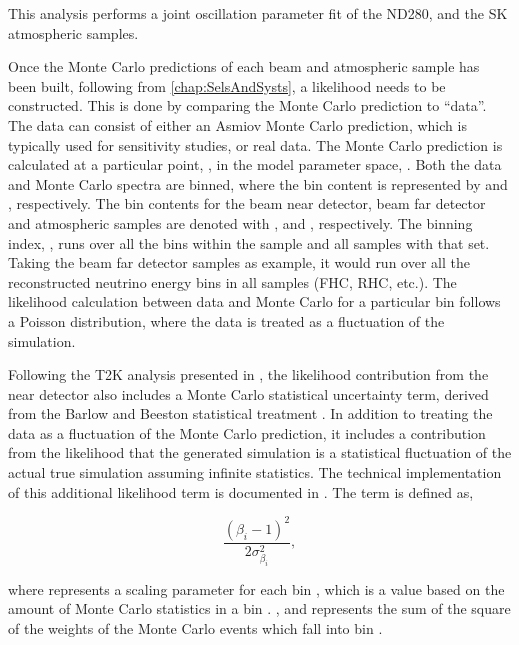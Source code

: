 This analysis performs a joint oscillation parameter fit of the ND280,  and the SK atmospheric samples.

Once the Monte Carlo predictions of each beam and atmospheric sample has been built, following from \autoref{chap:SelsAndSysts}, a likelihood needs to be constructed. This is done by comparing the Monte Carlo prediction to ``data''. The data can consist of either an Asmiov Monte Carlo prediction, which is typically used for sensitivity studies, or real data. The Monte Carlo prediction is calculated at a particular point, \quickmath{\vec{\theta}}, in the model parameter space, . Both the data and Monte Carlo spectra are binned, where the  bin content is represented by  and , respectively. The bin contents for the beam near detector, beam far detector and atmospheric samples are denoted with ,  and , respectively. The binning index, , runs over all the bins within the sample and all samples with that set. Taking the beam far detector samples as example, it would run over all the reconstructed neutrino energy bins in all samples (FHC, RHC, etc.). The likelihood calculation between data and Monte Carlo for a particular bin follows a Poisson distribution, where the data is treated as a fluctuation of the simulation. 

Following the T2K analysis presented in \cite{Dunne2020-uf}, the likelihood contribution from the near detector also includes a Monte Carlo statistical uncertainty term, derived from the Barlow and Beeston statistical treatment \cite{Barlow1993-cc, Conway2011-go}. In addition to treating the data as a fluctuation of the Monte Carlo prediction, it includes a contribution from the likelihood that the generated simulation is a statistical fluctuation of the actual true simulation assuming infinite statistics. The technical implementation of this additional likelihood term is documented in \cite{t2k_tn_395}. The term is defined as,

\begin{equation}
  \frac{(\beta_{i}-1)^{2}}{2\sigma^{2}_{\beta_{i}}},
\end{equation}

where  represents a scaling parameter for each bin , which is a value based on the amount of Monte Carlo statistics in a bin \cite{t2k_tn_395}. , and  represents the sum of the square of the weights of the Monte Carlo events which fall into bin .

